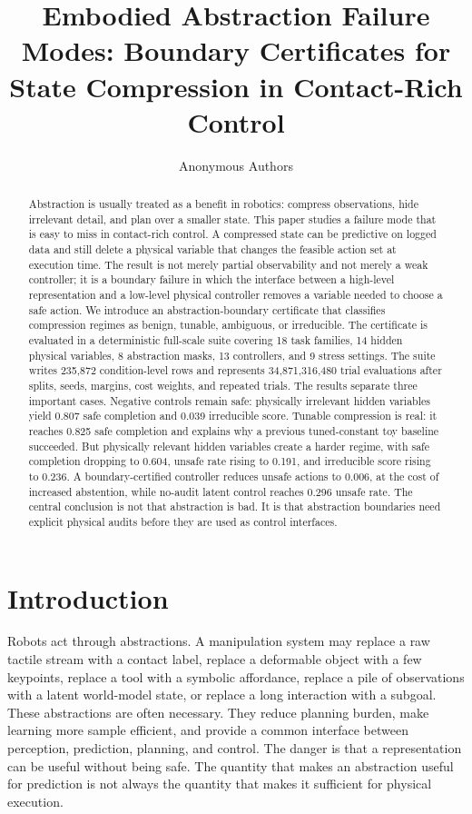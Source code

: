 \documentclass{article}
\title{Embodied Abstraction Failure Modes: Boundary Certificates for State Compression in Contact-Rich Control}
\author{Anonymous Authors}
\begin{document}
\maketitle

\begin{abstract}
Abstraction is usually treated as a benefit in robotics: compress observations,
hide irrelevant detail, and plan over a smaller state. This paper studies a
failure mode that is easy to miss in contact-rich control. A compressed state can
be predictive on logged data and still delete a physical variable that changes
the feasible action set at execution time. The result is not merely partial
observability and not merely a weak controller; it is a boundary failure in which
the interface between a high-level representation and a low-level physical
controller removes a variable needed to choose a safe action. We introduce an
abstraction-boundary certificate that classifies compression regimes as benign,
tunable, ambiguous, or irreducible. The certificate is evaluated in a deterministic
full-scale suite covering 18 task families, 14 hidden physical variables, 8
abstraction masks, 13 controllers, and 9 stress settings. The suite writes 235,872
condition-level rows and represents 34,871,316,480 trial evaluations after splits,
seeds, margins, cost weights, and repeated trials. The results separate three
important cases. Negative controls remain safe: physically irrelevant hidden
variables yield 0.807 safe completion and 0.039 irreducible score. Tunable
compression is real: it reaches 0.825 safe completion and explains why a previous
tuned-constant toy baseline succeeded. But physically relevant hidden variables
create a harder regime, with safe completion dropping to 0.604, unsafe rate rising
to 0.191, and irreducible score rising to 0.236. A boundary-certified controller
reduces unsafe actions to 0.006, at the cost of increased abstention, while
no-audit latent control reaches 0.296 unsafe rate. The central conclusion is not
that abstraction is bad. It is that abstraction boundaries need explicit physical
audits before they are used as control interfaces.
\end{abstract}

\section{Introduction}

Robots act through abstractions. A manipulation system may replace a raw tactile
stream with a contact label, replace a deformable object with a few keypoints,
replace a tool with a symbolic affordance, replace a pile of observations with a
latent world-model state, or replace a long interaction with a subgoal. These
abstractions are often necessary. They reduce planning burden, make learning more
sample efficient, and provide a common interface between perception, prediction,
planning, and control. The danger is that a representation can be useful without
being safe. The quantity that makes an abstraction useful for prediction is not
always the quantity that makes it sufficient for physical execution.
\end{document}
